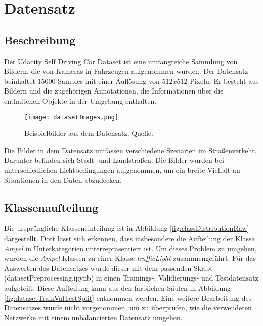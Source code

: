 \chapter{Datensatz}\label{chap:dataset}
\section{Beschreibung}
Der Udacity Self Driving Car Dataset \cite{datasetSelfDrivingCar} ist eine umfangreiche Sammlung von Bildern, die von Kameras in Fahrzeugen aufgenommen wurden. Der Datensatz beinhaltet 15000 Samples mit einer Auflösung von $512x512$ Pixeln. Er besteht aus Bildern und die zugehörigen Annotationen, die Informationen über die enthaltenen Objekte in der Umgebung enthalten.

\begin{figure}
	\centering
	\texttt{[image: datasetImages.png]}
	\caption[Beispielbilder aus dem Datensatz]{Beispielbilder aus dem Datensatz. Quelle: \cite{datasetSelfDrivingCar}}
	\label{fig:datasetImages}
\end{figure}

Die Bilder in dem Datensatz umfassen verschiedene Szenarien im Straßenverkehr. Darunter befinden sich Stadt- und Landstraßen. Die Bilder wurden bei unterschiedlichen Lichtbedingungen aufgenommen, um ein breite Vielfalt an Situationen in den Daten abzudecken. 


\section{Klassenaufteilung}
Die ursprüngliche Klasseneinteilung ist in Abbildung \ref{fig:classDistributionRaw} dargestellt. Dort lässt sich erkennen, dass insbesondere die Aufteilung der Klasse \textit{Ampel} in Unterkategorien unterrepräsentiert ist. Um dieses Problem zu umgehen, wurden die \textit{Ampel}-Klassen zu einer Klasse \textit{trafficLight} zusammengeführt. Für das Auswerten des Datensatzes wurde dieser mit dem passenden Skript (datasetPreprocessing.ipynb) in einen Trainings-, Validierungs- und Testdatensatz aufgeteilt. Diese Aufteilung kann aus den farblichen Säulen in Abbildung \ref{fig:datasetTrainValTestSplit} entnommen werden. Eine weitere Bearbeitung des Datensatzes wurde nicht vorgenommen, um zu überprüfen, wie die verwendeten Netzwerke mit einem unbalancierten Datensatz umgehen. 


